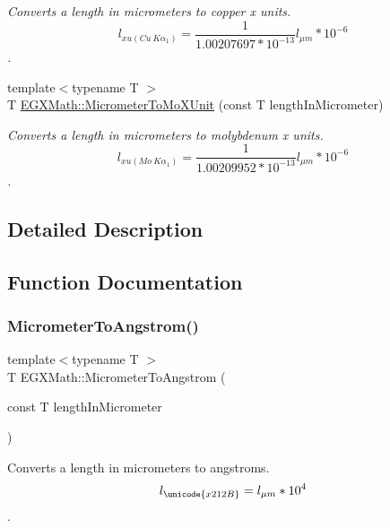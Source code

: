 \begin{DoxyCompactItemize}
\begin{DoxyCompactList}\small\item\em Converts a length in micrometers to copper x units. \[ l_{xu(Cu\ K\alpha_1)}= \frac{1}{1.00207697*10^{-13}} l_{\mu m} * 10^{-6}\]. \end{DoxyCompactList}\item 
{\footnotesize template$<$typename T $>$ }\\T \mbox{\hyperlink{group___e_g_x_math-_conversions-_length_conversions-_micrometer-_non-_s_i_ga2ed475ce56e23d7783d6925f5b409f44}{E\+G\+X\+Math\+::\+Micrometer\+To\+Mo\+X\+Unit}} (const T length\+In\+Micrometer)
\begin{DoxyCompactList}\small\item\em Converts a length in micrometers to molybdenum x units. \[ l_{xu(Mo\ K\alpha_1)}=\frac{1}{1.00209952*10^{-13}} l_{\mu m} * 10^{-6}\]. \end{DoxyCompactList}\end{DoxyCompactItemize}


\subsection{Detailed Description}


\subsection{Function Documentation}
\mbox{\label{group___e_g_x_math-_conversions-_length_conversions-_micrometer-_non-_s_i_ga4b7df35169682046455e9a6f99447777}} 
\subsubsection{\texorpdfstring{Micrometer\+To\+Angstrom()}{MicrometerToAngstrom()}}
{\footnotesize\ttfamily template$<$typename T $>$ \\
T E\+G\+X\+Math\+::\+Micrometer\+To\+Angstrom (\begin{DoxyParamCaption}\item[{const T}]{length\+In\+Micrometer }\end{DoxyParamCaption})}



Converts a length in micrometers to angstroms. \[ l_{\unicode{x212B}}=l_{\mu m} * 10^{4} \]. 

